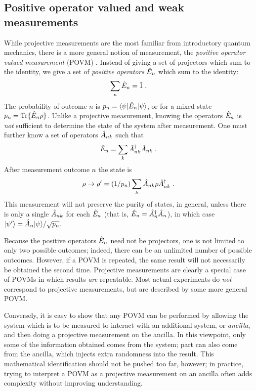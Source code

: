 \subsection{Positive operator valued and weak measurements}

While projective measurements are the most familiar from introductory
quantum mechanics, there is a more general notion of measurement, the
{\it positive operator valued measurement} (POVM) \cite{Peres}.
Instead of giving a set of projectors which sum to the identity, we
give a set of {\it positive operators} ${\hat E}_n$ which sum
to the identity:
\begin{equation}
\sum_n {\hat E}_n = {\hat 1} \;.
\end{equation}
The probability of outcome $n$ is $p_n = {\langle \psi |}{\hat E}_n{| \psi \rangle}$, or for
a mixed state $p_n = {\rm Tr}\{{\hat E}_n\rho\}$.  Unlike a projective measurement,
knowing the operators ${\hat E}_n$ is {\it not} sufficient to determine the
state of the system after measurement.  One must further know a set of
operators ${\hat A}_{nk}$ such that
\begin{equation}
{\hat E}_n = \sum_k {\hat A^\dagger}_{nk}{\hat A}_{nk} \;.
\end{equation}
After measurement outcome $n$ the state is
\begin{equation}
\rho \rightarrow \rho' = (1/p_n) \sum_k {\hat A}_{nk}\rho {\hat A^\dagger}_{nk} \;.
\end{equation}
This measurement will not preserve the purity of states, in general, unless
there is only a single ${\hat A}_{nk}$ for each ${\hat E}_n$ (that is,
${\hat E}_n = {\hat A^\dagger}_n{\hat A}_n$), in which case ${| \psi' \rangle} = {\hat A}_n{| \psi \rangle}/\sqrt{p_n}$.

Because the positive operators ${\hat E}_n$ need not be projectors, one is not
limited to only two possible outcomes; indeed, there can be an unlimited
number of possible outcomes.  However, if a POVM is repeated, the same
result will not necessarily be obtained the second time.  Projective
measurements are clearly a special case of POVMs in which results {\it are}
repeatable.  Most actual experiments do {\it not} correspond to projective
measurements, but are described by some more general POVM.

Conversely, it is easy to show that any POVM can be performed by allowing
the system which is to be measured to interact with an
additional system, or {\it ancilla}, and then doing a projective measurement
on the ancilla.  In this viewpoint, only some of the information obtained
comes from the system; part can also come from the ancilla, which injects
extra randomness into the result.  This mathematical identification
should not be pushed too far, however; in practice, trying to interpret a
POVM as a projective measurement on an ancilla often adds complexity without
improving understanding.

